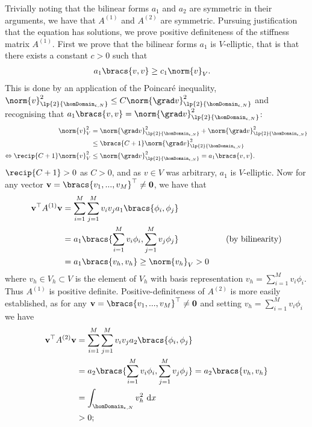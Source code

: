 Trivially noting that the bilinear forms $a_{1}$ and $a_{2}$ are symmetric in their arguments, we have that $A^{(1)}$ and $A^{(2)}$ are symmetric.
Pursuing justification that the equation  has solutions, we prove positive definiteness of the stiffness matrix $A^{(1)}$.
First we prove that the bilinear forms $a_{1}$ is $V$-elliptic, that is that there exists a constant $c>0$ such that
\begin{align*}
	a_{1}\bracs{v,v} &\geq c_{1}\norm{v}_{V}.
\end{align*}
This is done by an application of the Poincar\'e inequality, $\norm{v}_{\lp{2}{\homDomain_{\epsilon, N}}}^{2}\leq C\norm{\grad v}_{\lp{2}{\homDomain_{\epsilon, N}}}^{2}$ and recognising that $a_{1}\bracs{v,v}=\norm{\grad v}_{\lp{2}{\homDomain_{\epsilon, N}}}^{2}$:
\begin{align*}
	\norm{v}_{V}^{2} &= \norm{\grad v}_{\lp{2}{\homDomain_{\epsilon, N}}}^{2} + \norm{\grad v}_{\lp{2}{\homDomain_{\epsilon, N}}}^{2} \\
	&\leq \bracs{C+1}\norm{\grad v}_{\lp{2}{\homDomain_{\epsilon, N}}}^{2} \\
	\Leftrightarrow \recip{C+1}\norm{v}_{V}^{2} &\leq \norm{\grad v}_{\lp{2}{\homDomain_{\epsilon, N}}}^{2} = a_{1}\bracs{v,v}.
\end{align*}
$\recip{C+1}>0$ as $C>0$, and as $v\in V$ was arbitrary, $a_{1}$ is $V$-elliptic.
Now for any vector $\mathbf{v}=\bracs{v_{1},...,v_{M}}^{\top}\neq\mathbf{0}$, we have that
\begin{align*}
	\mathbf{v}^{\top}A^{(1)}\mathbf{v} &= \sum_{i=1}^{M}\sum_{j=1}^{M}v_{i}v_{j}a_{1}\bracs{\phi_{i},\phi_{j}} \\
	&= a_{1}\bracs{\sum_{i=1}^{M}v_{i}\phi_{i},\sum_{j=1}^{M}v_{j}\phi_{j}} &\quad \text{(by bilinearity)}\\
	&= a_{1}\bracs{v_{h},v_{h}} \geq \norm{v_{h}}_{V} > 0
\end{align*}
where $v_{h}\in V_{h}\subset V$ is the element of $V_{h}$ with basis representation $v_{h}=\sum_{i=1}^{M}v_{i}\phi_{i}$.
Thus $A^{(1)}$ is positive definite.
Positive-definiteness of $A^{(2)}$ is more easily established, as for any $\mathbf{v}=\bracs{v_{1},...,v_{M}}^{\top}\neq\mathbf{0}$ and setting $v_{h}=\sum_{i=1}^{M}v_{i}\phi_{i}$ we have
\begin{align*}
	\mathbf{v}^{\top}A^{(2)}\mathbf{v} &= \sum_{i=1}^{M}\sum_{j=1}^{M}v_{i}v_{j}a_{2}\bracs{\phi_{i},\phi_{j}} \\
	&= a_{2}\bracs{\sum_{i=1}^{M}v_{i}\phi_{i},\sum_{j=1}^{M}v_{j}\phi_{j}} = a_{2}\bracs{v_{h},v_{h}} \\
	&= \int_{\homDomain_{\epsilon, N}}v_{h}^{2} \ \mathrm{d}x \\
	&>0;
\end{align*}
